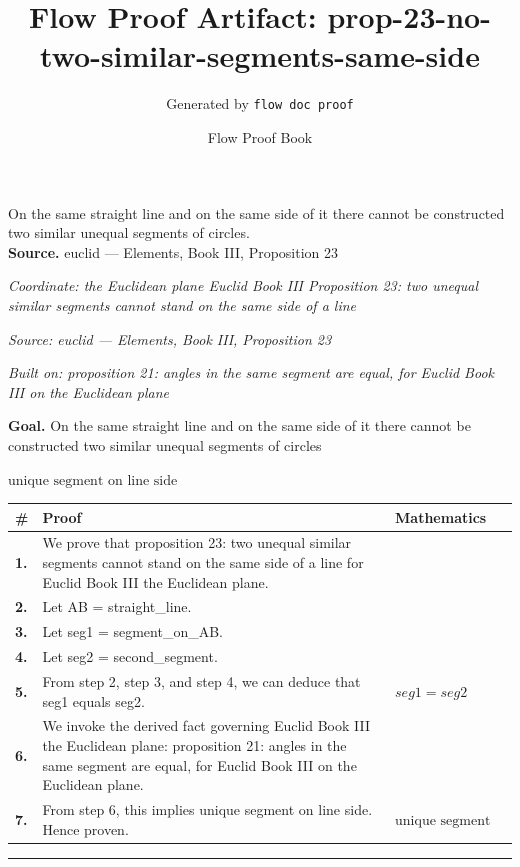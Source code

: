 \documentclass[11pt]{article}
\title{Flow Proof Artifact: prop-23-no-two-similar-segments-same-side}
\author{Generated by \texttt{flow doc proof}}
\date{Flow Proof Book}
\theoremstyle{definition}
\begin{document}
\maketitle
On the same straight line and on the same side of it there cannot be constructed two similar unequal segments of circles.\\[0.5em]
\textbf{Source.} euclid — Elements, Book III, Proposition 23\\[0.5em]
\bigskip
{}\par
\smallskip\noindent\textit{Coordinate: the Euclidean plane \cdot Euclid Book III \cdot Proposition 23: two unequal similar segments cannot stand on the same side of a line}\par
\smallskip\noindent\textit{Source: euclid — Elements, Book III, Proposition 23}\par
\smallskip\noindent\textit{Built on: proposition 21: angles in the same segment are equal, for Euclid Book III on the Euclidean plane}\par
\medskip
\noindent\textbf{Goal.} On the same straight line and on the same side of it there cannot be constructed two similar unequal segments of circles\par
\noindent$\displaystyle \text{unique segment on line side}$\par
\medskip
\noindent
\begin{tabular}{@{} >{\raggedright\arraybackslash}p{} >{\raggedright\arraybackslash}p{} >{\raggedleft\arraybackslash}p{} @{}}
\textbf{\#} & \textbf{Proof} & \textbf{Mathematics} \\
\midrule
\textbf{1.} & We prove that proposition 23: two unequal similar segments cannot stand on the same side of a line for Euclid Book III the Euclidean plane. & \\[0.45em]
\textbf{2.} & Let AB = straight\_line. & \\[0.45em]
\textbf{3.} & Let seg1 = segment\_on\_AB. & \\[0.45em]
\textbf{4.} & Let seg2 = second\_segment. & \\[0.45em]
\textbf{5.} & From step 2, step 3, and step 4, we can deduce that seg1 equals seg2. & $\displaystyle seg1 = seg2$ \\[0.45em]
\textbf{6.} & We invoke the derived fact governing Euclid Book III the Euclidean plane: proposition 21: angles in the same segment are equal, for Euclid Book III on the Euclidean plane. & \\[0.45em]
\textbf{7.} & From step 6, this implies unique segment on line side. Hence proven. & $\displaystyle \text{unique segment on line side}$ \\[0.45em]
\bottomrule
\end{tabular}
\label{thm:Geometry-Euclid Book III-proposition_23_two_unequal_similar_segments_cannot_stand_on_the_same_side_of_a_line}
\par\medskip\hrule
\end{document}
